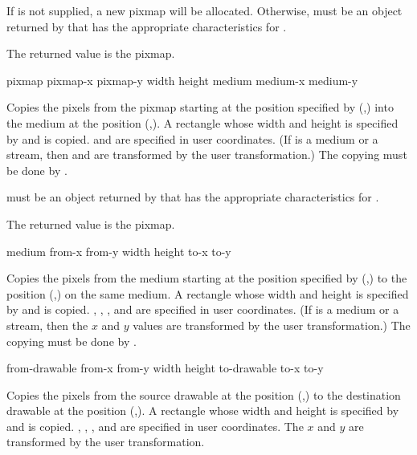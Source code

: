 If  is not supplied, a new pixmap will be allocated.  Otherwise,
 must be an object returned by  that has the
appropriate characteristics for .

The returned value is the pixmap.

 {pixmap pixmap-x pixmap-y width height
                           medium medium-x medium-y}

Copies the pixels from the pixmap  starting at the position
specified by (,) into the medium  at the
position (,).  A rectangle whose width and height is
specified by  and  is copied.   and
 are specified in user coordinates.  (If  is a medium or
a stream, then  and  are transformed by the user
transformation.)  The copying must be done by .

 must be an object returned by  that has the
appropriate characteristics for .

The returned value is the pixmap.

 {medium from-x from-y width height to-x to-y}

Copies the pixels from the medium  starting at the position
specified by (,) to the position (,)
on the same medium.  A rectangle whose width and height is specified by
 and  is copied.  , , ,
and  are specified in user coordinates.  (If  is a medium
or a stream, then the $x$ and $y$ values are transformed by the user
transformation.)  The copying must be done by .


 {from-drawable from-x from-y width height
                                to-drawable to-x to-y}

Copies the pixels from the source drawable  at the position
(,) to the destination drawable  at the
position (,).  A rectangle whose width and height is
specified by  and  is copied.  ,
, , and  are specified in user coordinates.
The $x$ and $y$ are transformed by the user transformation.

